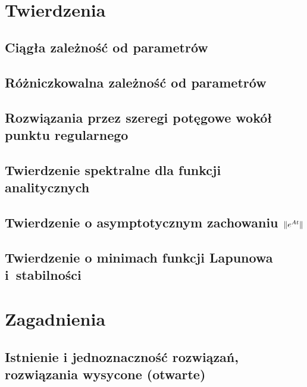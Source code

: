 



  \maketitle
  \newpage~
  \thispagestyle{empty}
  \tableofcontents
  
  \chapter{Twierdzenia}
    \section{Ciągła zależność od parametrów}
      
    \section{Różniczkowalna zależność od parametrów}
      
    \section{Rozwiązania przez szeregi potęgowe wokół punktu regularnego}
      \pagebreak
    \section{Twierdzenie spektralne dla funkcji analitycznych}
      
    \section{Twierdzenie o asymptotycznym zachowaniu $ \lVert e^{At}\rVert $}
      
    \section{Twierdzenie o minimach funkcji Lapunowa i~stabilności}
      
    
  \chapter{Zagadnienia}
    \section{Istnienie i jednoznaczność rozwiązań, rozwiązania wysycone (otwarte)}
      

